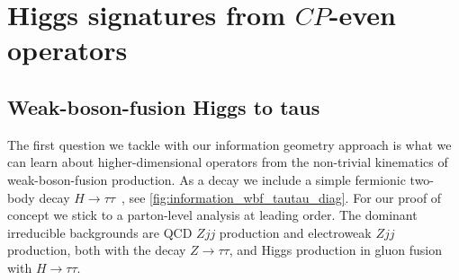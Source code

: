 


\section{Higgs signatures from $CP$-even operators}
\label{sec:information_application_even}

\subsection{Weak-boson-fusion Higgs to taus}
\label{sec:information_wbf_taus}

The first question we tackle with our information geometry approach is
what we can learn about higher-dimensional operators from the
non-trivial kinematics of weak-boson-fusion production. As a decay we
include a simple fermionic two-body decay
$H \to \tau \tau$~\cite{wbf_tau}, see \autoref{fig:information_wbf_tautau_diag}.
For our proof of concept we stick to a parton-level analysis at
leading order.  The dominant irreducible backgrounds are QCD $Zjj$
production and electroweak $Zjj$ production, both with the decay
$Z \to \tau \tau$, and Higgs production in gluon fusion with
$H \to \tau \tau$. 

